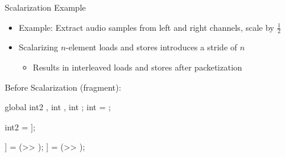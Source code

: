 
%
%


%
%


\begin{frame}[fragile]{Scalarization Example}

\begin{itemize}
    \item Example: Extract audio samples from left and right channels, scale by $\frac{1}{2}$
    \item Scalarizing $n$-element loads and stores introduces a stride of $n$
    \begin{itemize}
        \item Results in interleaved loads and stores after packetization
    \end{itemize}
\end{itemize}

\begin{minipage}[t]{0.45\linewidth}

\vspace{0.1ex}
Before Scalarization (fragment):
\begin{codebox}[commandchars=\\\[\]]
global int2 \uniform[*src], int \uniform[*left], int \uniform[*right];
int \varying[tid] = ;


int2 \varying[sample] = \uniform[src]\idx[\varying[tid]];


\uniform[left]\idx[\varying[tid]] = (\varying[sample.x] >> \uniform[1]);
\uniform[right]\idx[\varying[tid]] = (\varying[sample.y] >> \uniform[1]);
\end{codebox}

\end{minipage}
\hspace{1em}
\begin{minipage}[t]{0.49\linewidth}


\end{minipage}
\end{frame}
